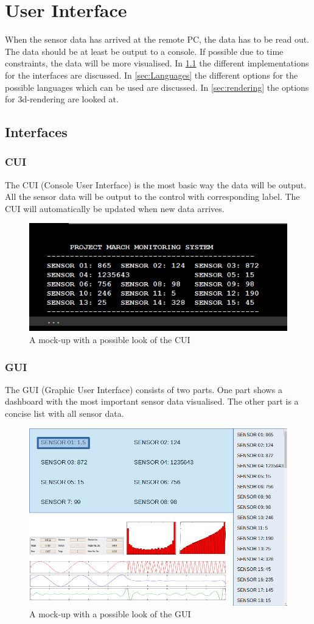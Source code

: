 \section{User Interface}\label{sec:ui}
When the sensor data has arrived at the remote PC, the data has to be read out. The data should be at least be output to a console. If possible due to time constraints, the data will be more visualised. In \ref{sec: Interfaces} the different implementations for the interfaces are discussed. In \ref{sec:Languages} the different options for the possible languages which can be used are discussed. In \ref{sec:rendering} the options for 3d-rendering are looked at.
\subsection{Interfaces}\label{sec: Interfaces}
\subsubsection{CUI}
The CUI (Console User Interface) is the most basic way the data will be output. All the sensor data will be output to the control with corresponding label. The CUI will automatically be updated when new data arrives. 
\begin{figure}[H]
	\centering
	\includegraphics[width=.75\textwidth]{MockupCUI}
	\caption{A mock-up with a possible look of the CUI} 
\end{figure} 
\subsubsection{GUI}
The GUI (Graphic User Interface) consists of two parts. One part shows a dashboard with the most important sensor data visualised. The other part is a concise list with all sensor data.  
\begin{figure}[H]
	\centering
	\includegraphics[width=.75\textwidth]{MockupGUI}
	\caption{A mock-up with a possible look of the GUI} 
\end{figure} 
